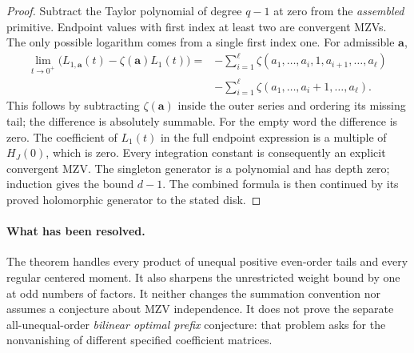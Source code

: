 \begin{proof}
Subtract the Taylor polynomial of degree $q-1$ at zero from the
\emph{assembled} primitive. Endpoint values with first index at least
two are convergent MZVs. The only possible logarithm comes from a
single first index one. For admissible $\boldsymbol a$,
\begin{align*}
 \lim_{t\to0^+}\bigl(L_{1,\boldsymbol a}(t)
                  -\zeta(\boldsymbol a)L_1(t)\bigr)
 ={}&-\sum_{i=1}^{\ell}\zeta(a_1,\ldots,a_i,1,a_{i+1},\ldots,a_\ell)\\
    &-\sum_{i=1}^{\ell}\zeta(a_1,\ldots,a_i+1,\ldots,a_\ell).
\end{align*}
This follows by subtracting $\zeta(\boldsymbol a)$ inside the outer
series and ordering its missing tail; the difference is absolutely
summable. For the empty word the difference is zero. The coefficient
of $L_1(t)$ in the full endpoint expression is a multiple of $H_J(0)$,
which is zero. Every integration constant is consequently an explicit
convergent MZV. The singleton generator is a polynomial and has depth
zero; induction gives the bound $d-1$. The combined formula is then
continued by its proved holomorphic generator to the stated disk.
\end{proof}

\paragraph{What has been resolved.}
The theorem handles every product of unequal positive even-order tails
and every regular centered moment. It also sharpens the unrestricted
weight bound by one at odd numbers of factors. It neither changes the
summation convention nor assumes a conjecture about MZV independence.
It does not prove the separate all-unequal-order \emph{bilinear optimal
prefix} conjecture: that problem asks for the nonvanishing of different
specified coefficient matrices.
